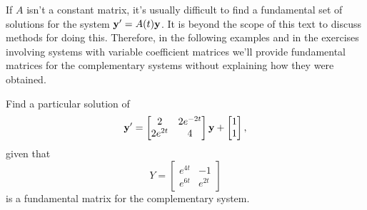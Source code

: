 If $A$ isn't  a constant matrix, it's usually difficult to find a
fundamental set of solutions for the system $\mathbf{y}'=A(t)\mathbf{y}$. It
is beyond the scope of this text to discuss methods for doing this.
Therefore, in the following examples and in the exercises involving
systems with variable coefficient matrices we'll provide fundamental
matrices for the complementary systems without explaining how they
were obtained.

\begin{example}\label{example:10.7.2}
Find a particular solution of
\begin{equation} \label{eq:10.7.6}
\mathbf{y}'=\begin{bmatrix}2&2e^{-2t}\\2e^{2t}&4\end{bmatrix}
\mathbf{y}+\begin{bmatrix}1\\1\end{bmatrix},
\end{equation}
given that
\[
Y=\begin{bmatrix}e^{4t}&-1\\e^{6t}&e^{2t}\end{bmatrix}
\]
is  a fundamental matrix for the complementary system.
\end{example}

